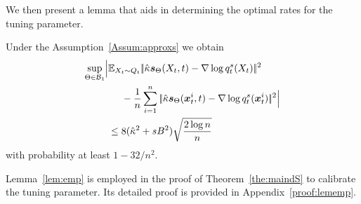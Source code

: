 We then present a lemma that aids in determining the optimal rates for the tuning parameter.
\begin{lemma}\label{lem:emp}
Under the Assumption~\ref{Assum:approxs} 
we obtain 
\begin{align*}
   \sup_{\textcolor{black}{\Theta}\in \textcolor{black}{\mathcal{B}_1}}\Bigl|&\textcolor{black}{\mathbb{E}}_{X_t\sim Q_t}|\!|\hat{\kappa}\textcolor{black}{\textcolor{black}{\boldsymbol{s}}_{\textcolor{black}{\Theta}}}(X_t,t)-\nabla\log q^s_t(X_t)|\!|^2\\
     &~~~~-\frac{1}{n} \sum_{i=1}^{n}  |\!|\hat{\kappa}\textcolor{black}{\textcolor{black}{\boldsymbol{s}}_{\textcolor{black}{\Theta}}}(\textcolor{black}{\boldsymbol{x}}_t^i,t)-\nabla\log q^s_t(\textcolor{black}{\boldsymbol{x}}_t^i)|\!|^2\Bigr|\\
     &\le 8 (\hat{\kappa}^2+s B^2) \sqrt{\frac{2\log n}{n}}
\end{align*}
with probability at least $1-32/n^2$.
\end{lemma}
Lemma~\ref{lem:emp} is employed in the proof of Theorem~\ref{the:maindS} to calibrate the tuning parameter. 
Its detailed proof  is provided in Appendix~\ref{proof:lememp}. 
